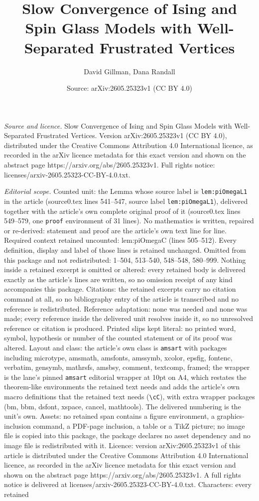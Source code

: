 \documentclass[10pt,a4paper]{amsart}
\title[Slow Convergence of Ising and Spin Glass Models with Well-Se]{Slow Convergence of Ising and Spin Glass Models with Well-Separated Frustrated Vertices}
\author{David Gillman, Dana Randall}
\date{Source: arXiv:2605.25323v1 (CC BY 4.0)}
\begin{document}
\maketitle

\noindent\emph{Source and licence.} Slow Convergence of Ising and Spin Glass Models with Well-Separated Frustrated Vertices. Version arXiv:2605.25323v1 (CC BY 4.0), distributed under the Creative Commons Attribution 4.0 International licence, as recorded in the arXiv licence metadata for this exact version and shown on the abstract page https://arxiv.org/abs/2605.25323v1. Full rights notice: licenses/arxiv-2605.25323-CC-BY-4.0.txt.\par\smallskip

\noindent\textit{Editorial scope.} Counted unit: the Lemma whose source label is \texttt{lem:piOmegaL1} in the article (source0.tex lines 541--547, source label \texttt{lem:piOmegaL1}), delivered together with the article's own complete original proof of it (source0.tex lines 549--579, one \texttt{proof} environment of 31 lines). No mathematics is written, repaired or re-derived: statement and proof are the article's own text line for line. Required context retained uncounted: lem:piOmegaC (lines 505--512). Every definition, display and label of those lines is retained unchanged. Omitted from this package and not redistributed: 1--504, 513--540, 548--548, 580--999. Nothing inside a retained excerpt is omitted or altered: every retained body is delivered exactly as the article's lines are written, so no omission receipt of any kind accompanies this package. Citations: the retained excerpts carry no citation command at all, so no bibliography entry of the article is transcribed and no reference is redistributed. Reference adaptation: none was needed and none was made; every reference inside the delivered unit resolves inside it, so no unresolved reference or citation is produced. Printed slips kept literal: no printed word, symbol, hypothesis or number of the counted statement or of its proof was altered. Layout and class: the article's own class is \texttt{amsart} with packages including microtype, amsmath, amsfonts, amssymb, xcolor, epsfig, fontenc, verbatim, gensymb, mathrsfs, amsbsy, comment, textcomp, framed; the wrapper is the lane's pinned \texttt{amsart} editorial wrapper at 10pt on A4, which restates the theorem-like environments the retained text needs and adds the article's own macro definitions that the retained text needs (\texttt{\textbackslash cC}), with extra wrapper packages (bm, bbm, dsfont, xspace, cancel, mathtools). The delivered numbering is the unit's own. Assets: no retained span contains a figure environment, a graphics-inclusion command, a PDF-page inclusion, a table or a TikZ picture; no image file is copied into this package, the package declares no asset dependency and no image file is redistributed with it. Licence: version arXiv:2605.25323v1 of this article is distributed under the Creative Commons Attribution 4.0 International licence, as recorded in the arXiv licence metadata for this exact version and shown on the abstract page https://arxiv.org/abs/2605.25323v1. A full rights notice is delivered at licenses/arxiv-2605.25323-CC-BY-4.0.txt. Characters: every retained 
\end{document}
